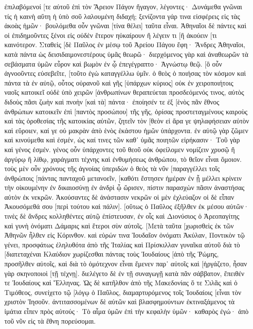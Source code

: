 ἐπιλαβόμενοί [τε αὐτοῦ ἐπὶ τὸν Ἄρειον Πάγον ἤγαγον, λέγοντες· Δυνάμεθα γνῶναι τίς ἡ καινὴ αὕτη ἡ ὑπὸ σοῦ λαλουμένη διδαχή; 
ξενίζοντα γάρ τινα εἰσφέρεις εἰς τὰς ἀκοὰς ἡμῶν· βουλόμεθα οὖν γνῶναι [τίνα θέλει] ταῦτα εἶναι. 
Ἀθηναῖοι δὲ πάντες καὶ οἱ ἐπιδημοῦντες ξένοι εἰς οὐδὲν ἕτερον ηὐκαίρουν ἢ λέγειν τι [ἢ ἀκούειν [τι καινότερον. 
Σταθεὶς [δὲ Παῦλος ἐν μέσῳ τοῦ Ἀρείου Πάγου ἔφη· Ἄνδρες Ἀθηναῖοι, κατὰ πάντα ὡς δεισιδαιμονεστέρους ὑμᾶς θεωρῶ· 
διερχόμενος γὰρ καὶ ἀναθεωρῶν τὰ σεβάσματα ὑμῶν εὗρον καὶ βωμὸν ἐν ᾧ ἐπεγέγραπτο· Ἀγνώστῳ θεῷ. [ὃ οὖν ἀγνοοῦντες εὐσεβεῖτε, [τοῦτο ἐγὼ καταγγέλλω ὑμῖν. 
ὁ θεὸς ὁ ποιήσας τὸν κόσμον καὶ πάντα τὰ ἐν αὐτῷ, οὗτος οὐρανοῦ καὶ γῆς [ὑπάρχων κύριος] οὐκ ἐν χειροποιήτοις ναοῖς κατοικεῖ 
οὐδὲ ὑπὸ χειρῶν [ἀνθρωπίνων θεραπεύεται προσδεόμενός τινος, αὐτὸς διδοὺς πᾶσι ζωὴν καὶ πνοὴν [καὶ τὰ] πάντα· 
ἐποίησέν τε ἐξ [ἑνὸς πᾶν ἔθνος ἀνθρώπων κατοικεῖν ἐπὶ [παντὸς προσώπου] τῆς γῆς, ὁρίσας προστεταγμένους καιροὺς καὶ τὰς ὁροθεσίας τῆς κατοικίας αὐτῶν, 
ζητεῖν τὸν [θεὸν εἰ ἄρα γε ψηλαφήσειαν αὐτὸν καὶ εὕροιεν, καί γε οὐ μακρὰν ἀπὸ ἑνὸς ἑκάστου ἡμῶν ὑπάρχοντα. 
ἐν αὐτῷ γὰρ ζῶμεν καὶ κινούμεθα καὶ ἐσμέν, ὡς καί τινες τῶν καθ᾽ ὑμᾶς ποιητῶν εἰρήκασιν· Τοῦ γὰρ καὶ γένος ἐσμέν. 
γένος οὖν ὑπάρχοντες τοῦ θεοῦ οὐκ ὀφείλομεν νομίζειν χρυσῷ ἢ ἀργύρῳ ἢ λίθῳ, χαράγματι τέχνης καὶ ἐνθυμήσεως ἀνθρώπου, τὸ θεῖον εἶναι ὅμοιον. 
τοὺς μὲν οὖν χρόνους τῆς ἀγνοίας ὑπεριδὼν ὁ θεὸς τὰ νῦν [παραγγέλλει τοῖς ἀνθρώποις [πάντας πανταχοῦ μετανοεῖν, 
[καθότι ἔστησεν ἡμέραν ἐν ᾗ μέλλει κρίνειν τὴν οἰκουμένην ἐν δικαιοσύνῃ ἐν ἀνδρὶ ᾧ ὥρισεν, πίστιν παρασχὼν πᾶσιν ἀναστήσας αὐτὸν ἐκ νεκρῶν. 
Ἀκούσαντες δὲ ἀνάστασιν νεκρῶν οἱ μὲν ἐχλεύαζον οἱ δὲ εἶπαν Ἀκουσόμεθά σου [περὶ τούτου καὶ πάλιν]. 
[οὕτως ὁ Παῦλος ἐξῆλθεν ἐκ μέσου αὐτῶν· 
τινὲς δὲ ἄνδρες κολληθέντες αὐτῷ ἐπίστευσαν, ἐν οἷς καὶ Διονύσιος ὁ Ἀρεοπαγίτης καὶ γυνὴ ὀνόματι Δάμαρις καὶ ἕτεροι σὺν αὐτοῖς. 
[Μετὰ ταῦτα [χωρισθεὶς ἐκ τῶν Ἀθηνῶν ἦλθεν εἰς Κόρινθον. 
καὶ εὑρών τινα Ἰουδαῖον ὀνόματι Ἀκύλαν, Ποντικὸν τῷ γένει, προσφάτως ἐληλυθότα ἀπὸ τῆς Ἰταλίας καὶ Πρίσκιλλαν γυναῖκα αὐτοῦ διὰ τὸ [διατεταχέναι Κλαύδιον χωρίζεσθαι πάντας τοὺς Ἰουδαίους [ἀπὸ τῆς Ῥώμης, προσῆλθεν αὐτοῖς, 
καὶ διὰ τὸ ὁμότεχνον εἶναι ἔμενεν παρ᾽ αὐτοῖς καὶ [ἠργάζετο, ἦσαν γὰρ σκηνοποιοὶ [τῇ τέχνῃ]. 
διελέγετο δὲ ἐν τῇ συναγωγῇ κατὰ πᾶν σάββατον, ἔπειθέν τε Ἰουδαίους καὶ Ἕλληνας. 
Ὡς δὲ κατῆλθον ἀπὸ τῆς Μακεδονίας ὅ τε Σιλᾶς καὶ ὁ Τιμόθεος, συνείχετο τῷ [λόγῳ ὁ Παῦλος, διαμαρτυρόμενος τοῖς Ἰουδαίοις [εἶναι τὸν χριστὸν Ἰησοῦν. 
ἀντιτασσομένων δὲ αὐτῶν καὶ βλασφημούντων ἐκτιναξάμενος τὰ ἱμάτια εἶπεν πρὸς αὐτούς· Τὸ αἷμα ὑμῶν ἐπὶ τὴν κεφαλὴν ὑμῶν· καθαρὸς ἐγώ· ἀπὸ τοῦ νῦν εἰς τὰ ἔθνη πορεύσομαι. 
